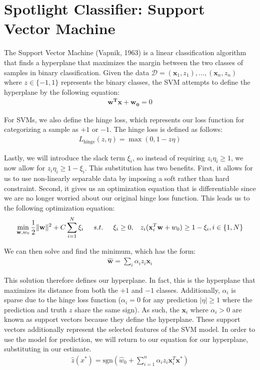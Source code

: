 \documentclass{article} %
\begin{document}
\section{Spotlight Classifier: Support Vector Machine}

The Support Vector Machine (Vapnik, 1963) is a linear classification algorithm that finds a hyperplane that maximizes the margin between the two classes of samples in binary classification. Given the data $\mathcal{D} = {(\textbf{x}_1,z_1),...,(\textbf{x}_n,z_n)}$ where $z \in \{-1, 1\}$ represents the binary classes, the SVM attempts to define the hyperplane by the following equation:
\begin{align*}
\textbf{w}^{\textbf{T}}\textbf{x} + \textbf{w}_{\textbf{0}} = 0
\end{align*}

For SVMs, we also define the hinge loss, which represents our loss function for categorizing a sample as $+1$ or $-1$. The hinge loss is defined as follows:
\begin{align*}
L_{\text{hinge}}(z,\eta) = \max(0,1-z\eta)
\end{align*}

Lastly, we will introduce the slack term $\xi_i$, so instead of requiring $z_i\eta_i \geq 1$, we now allow for $z_i\eta_i \geq 1-\xi_i$. This substitution has two benefits. First, it allows for us to use non-linearly separable data by imposing a soft rather than hard constraint. Second, it gives us an optimization equation that is differentiable since we are no longer worried about our original hinge loss function. This leads us to the following optimization equation:
\begin{align*}
\min_{\textbf{w},w_0} \frac{1}{2} \lVert \textbf{w} \rVert^2 + C \sum_{i=1}^N \xi_i \hspace{5mm} s.t. \hspace{5mm} \xi_i \geq 0, \hspace{3mm} z_i(\textbf{x}_i^T \textbf{w} + w_0) \geq 1 - \xi_i, i \in \{1,N\}
\end{align*}

We can then solve and find the minimum, which has the form:
\begin{align*}
\hat{\textbf{w}} = \sum\limits_{i} \alpha_i z_i \textbf{x}_i
\end{align*}

This solution therefore defines our hyperplane. In fact, this is the hyperplane that maximizes its distance from both the $+1$ and $-1$ classes. Additionally, $\alpha_i$ is sparse due to the hinge loss function ($\alpha_i = 0$ for any prediction $\lvert \eta \rvert \geq 1$ where the prediction and truth $z$ share the same sign). As such, the $\textbf{x}_i$ where $\alpha_i > 0$ are known as support vectors because they define the hyperplane. These support vectors additionally represent the selected features of the SVM model. In order to use the model for prediction, we will return to our equation for our hyperplane, substituting in our estimate.
\begin{align*}
\hat{z}(x^*) = \text{sgn} \left(\hat{w}_0 + \sum_{i=1}^{n} \alpha_i z_i \textbf{x}_i^T \textbf{x}^*\right)
\end{align*}
\end{document}
